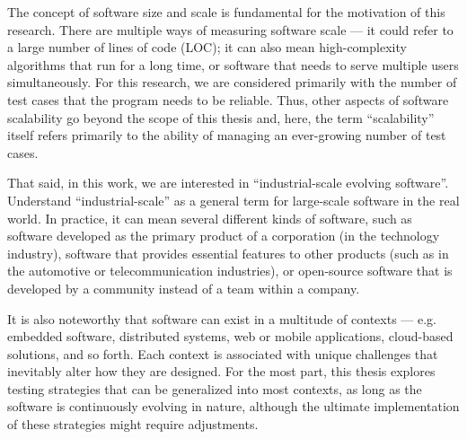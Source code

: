 The concept of software size and scale is fundamental for the motivation of this research.
There are multiple ways of measuring software scale --- it could refer to a large number of lines of code (LOC); it can also mean high-complexity algorithms that run for a long time, or software that needs to serve multiple users simultaneously.
For this research, we are considered primarily with the number of test cases that the program needs to be reliable.
Thus, other aspects of software scalability go beyond the scope of this thesis and, here, the term ``scalability'' itself refers primarily to the ability of managing an ever-growing number of test cases.

That said, in this work, we are interested in ``industrial-scale evolving software''.
Understand ``industrial-scale'' as a general term for large-scale software in the real world.
In practice, it can mean several different kinds of software, such as software developed as the primary product of a corporation (in the technology industry), software that provides essential features to other products (such as in the automotive or telecommunication industries), or open-source software that is developed by a community instead of a team within a company.

It is also noteworthy that software can exist in a multitude of contexts --- e.g. embedded software, distributed systems, web or mobile applications, cloud-based solutions, and so forth.
Each context is associated with unique challenges that inevitably alter how they are designed.
For the most part, this thesis explores testing strategies that can be generalized into most contexts, as long as the software is continuously evolving in nature, although the ultimate implementation of these strategies might require adjustments.
